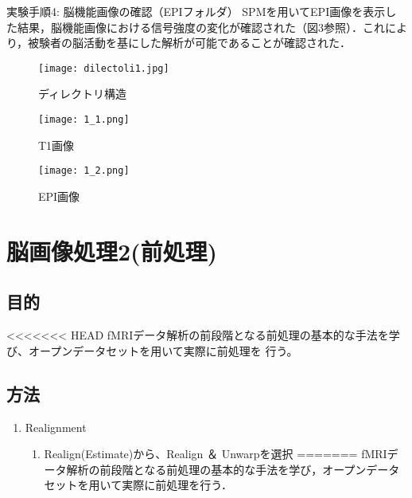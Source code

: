 \documentclass{jlreq}
\begin{document}
\begin{enumerate}
実験手順4: 脳機能画像の確認（EPIフォルダ）
SPMを用いてEPI画像を表示した結果，脳機能画像における信号強度の変化が確認された（図3参照）．これにより，被験者の脳活動を基にした解析が可能であることが確認された．

\begin{figure}[H]
    \centering
        \begin{minipage}{0.25\textwidth}
        \centering
        \texttt{[image: dilectoli1.jpg]}
        \caption{ディレクトリ構造}
        \label{fig:brain_T1}
    \end{minipage}
    \hfill
    \begin{minipage}{0.2\textwidth}
        \centering
        \texttt{[image: 1\_1.png]}
        \caption{T1画像}
        \label{fig:brain_T1}
    \end{minipage}
    \hfill
    \begin{minipage}{0.2\textwidth}
        \centering
        \texttt{[image: 1\_2.png]}
        \caption{EPI画像}
        \label{fig:brain_EPI}
    \end{minipage}
\end{figure}

\section{脳画像処理2(前処理)}
\subsection{目的}
<<<<<<< HEAD
fMRIデータ解析の前段階となる前処理の基本的な手法を学び、オープンデータセットを用いて実際に前処理を
行う。
\subsection{方法}
\begin{enumerate}
    \item Realignment
    \begin{enumerate}
        \item Realign(Estimate)から、Realign ＆ Unwarpを選択
=======
fMRIデータ解析の前段階となる前処理の基本的な手法を学び，オープンデータセットを用いて実際に前処理を行う．

\end{enumerate}
\end{enumerate}
\end{enumerate}
\end{document}
